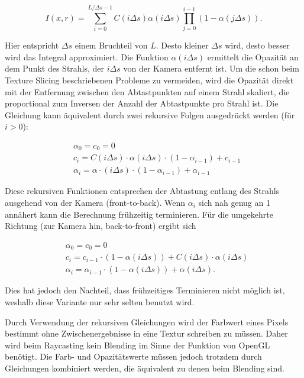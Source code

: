 \documentclass[a4paper,fontsize=12pt,toc=bib,parskip=half,ngerman]{scrartcl}
\begin{document}
\begin{equation}
I(x,r) = \sum_{i=0}^{L/\Delta s - 1} C(i\Delta s)\alpha(i\Delta s) \prod_{j=0}^{i-1}( 1 - \alpha(j \Delta s)).
\end{equation}

Hier entspricht $\Delta s$ einem Bruchteil von $L$. Desto kleiner $\Delta s$ wird, desto besser wird das Integral approximiert. Die Funktion $\alpha(i \Delta s)$ ermittelt die Opazit\"at an dem Punkt des Strahls, der $i \Delta s$ von der Kamera entfernt ist. Um die schon beim Texture Slicing beschriebenen Probleme zu vermeiden, wird die Opazit\"at direkt mit der Entfernung zwischen den Abtastpunkten auf einem Strahl skaliert, die proportional zum Inversen der Anzahl der Abtastpunkte pro Strahl ist.
Die Gleichung kann \"aquivalent durch zwei rekursive Folgen ausgedr\"uckt werden (f\"ur $i > 0$):

\begin{align}
&\alpha_0 = c_0 = 0\\
&c_i = C(i\Delta s)\cdot\alpha(i\Delta s)\cdot(1-\alpha_{i-1}) + c_{i-1} \label{RaycastingFormula1}\\
&\alpha_i = \alpha\cdot(i \Delta s)\cdot(1-\alpha_{i-1}) + \alpha_{i-1} \label{RaycastingFormula2}
\end{align} 

Diese rekursiven Funktionen entsprechen der Abtastung entlang des Strahls ausgehend von der Kamera (front-to-back). Wenn $\alpha_i$ sich nah genug an 1 ann\"ahert kann die Berechnung fr\"uhzeitig terminieren. F\"ur die umgekehrte Richtung (zur Kamera hin, back-to-front) ergibt sich

\begin{align}
&\alpha_0 = c_0 = 0\\
&c_i = c_{i-1}\cdot(1 - \alpha(i\Delta s)) + C(i\Delta s)\cdot\alpha(i\Delta s)\\
&\alpha_i = \alpha_{i-1}\cdot(1 - \alpha(i\Delta s)) + \alpha(i \Delta s).
\end{align}

Dies hat jedoch den Nachteil, dass fr\"uhzeitiges Terminieren nicht m\"oglich ist, weshalb diese Variante nur sehr selten benutzt wird.

Durch Verwendung der rekursiven Gleichungen wird der Farbwert eines Pixels bestimmt ohne Zwischenergebnisse in eine Textur schreiben zu m\"ussen. Daher wird beim Raycasting kein Blending im Sinne der Funktion von OpenGL ben\"otigt. Die Farb- und Opazit\"atswerte m\"ussen jedoch trotzdem durch Gleichungen kombiniert werden, die \"aquivalent zu denen beim Blending sind.
\end{document}
